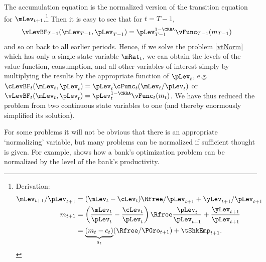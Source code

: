 \documentclass[titlepage]{\econtex}
\begin{document}
The accumulation equation is the normalized version of the transition
equation for $\mLev_{t+1}$.\footnote{Derivation:
  \begin{equation*}\begin{gathered}\begin{aligned}
    \mLev_{t+1}/\pLev_{t+1}  & = (\mLev_{t}-\cLev_{t})\Rfree/\pLev_{t+1} + {\yLev}_{t+1}/\pLev_{t+1}
    \\      {m}_{t+1}  & = \left(\frac{\mLev_{t}}{\pLev_{t}} - \frac{\cLev_{t}}{\pLev_{t}}\right)\Rfree\frac{\pLev_{t}}{\pLev_{t+1}} + \frac{{\yLev}_{t+1}}{\pLev_{t+1}}
    \\        & = \underbrace{({m}_{t} - {c}_{t})}_{{a}_{t}}(\Rfree/\PGro_{t+1}) + \tShkEmp_{t+1}.
  \end{aligned}\end{gathered}\end{equation*}
}  Then it is easy to see that for $t=T-1$,
\begin{equation*}\begin{gathered}\begin{aligned}
  \vLevBF_{T-1}(\mLev_{T-1},\pLev_{T-1})  & =  \pLev_{T-1}^{1-\CRRA}\null{\vFunc}_{T-1}({m}_{T-1})
\end{aligned}\end{gathered}\end{equation*}
and so on back to all earlier periods.  Hence, if we solve the problem \eqref{vtNorm}
which has only a single state variable $\mRat_{t}$, we can obtain the levels of
the value function, consumption, and all other variables of interest
simply by multiplying the results by
the appropriate function of $\pLev_{t}$, e.g.\ $\cLevBF_{t}(\mLev_{t},\pLev_{t})=\pLev_{t}\cFunc_{t}(\mLev_{t}/\pLev_{t})$ or $\vLevBF_{t}({\mLev}_{t},\pLev_{t}) = \pLev_{t}^{1-\CRRA}\vFunc_{t}({m}_{t})$.  We have thus reduced the
problem from two continuous state variables to one (and thereby enormously simplified its solution).

For some problems it will not be obvious that there is an appropriate
`normalizing' variable, but many problems can be normalized if
sufficient thought is given.  For example, \cite{valencia:2006} shows
how a bank's optimization problem can be normalized by the level of
the bank's productivity.

\end{document}

